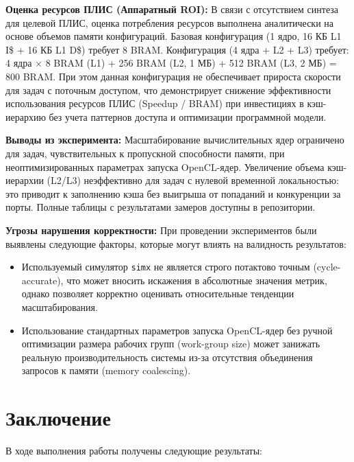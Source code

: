 \documentclass[a4paper]{article}
\begin{document}
\textbf{Оценка ресурсов ПЛИС (Аппаратный ROI):}
В связи с отсутствием синтеза для целевой ПЛИС, оценка потребления ресурсов выполнена аналитически на основе объемов памяти конфигураций. Базовая конфигурация (1 ядро, 16 КБ L1 I\$ + 16 КБ L1 D\$) требует 8 BRAM. Конфигурация (4 ядра + L2 + L3) требует: 4 ядра $\times$ 8 BRAM (L1) + 256 BRAM (L2, 1 МБ) + 512 BRAM (L3, 2 МБ) = 800 BRAM. При этом данная конфигурация не обеспечивает прироста скорости для задач с поточным доступом, что демонстрирует снижение эффективности использования ресурсов ПЛИС (Speedup / BRAM) при инвестициях в кэш-иерархию без учета паттернов доступа и оптимизации программной модели.

\textbf{Выводы из эксперимента:} Масштабирование вычислительных ядер ограничено для задач, чувствительных к пропускной способности памяти, при неоптимизированных параметрах запуска OpenCL-ядер. Увеличение объема кэш-иерархии (L2/L3) неэффективно для задач с нулевой временной локальностью: это приводит к заполнению кэша без выигрыша от попаданий и конкуренции за порты. Полные таблицы с результатами замеров доступны в репозитории.

\textbf{Угрозы нарушения корректности:}
При проведении экспериментов были выявлены следующие факторы, которые могут влиять на валидность результатов:
\begin{itemize}
    \item Используемый симулятор \texttt{simx} не является строго потактово точным (cycle-accurate), что может вносить искажения в абсолютные значения метрик, однако позволяет корректно оценивать относительные тенденции масштабирования.
    \item Использование стандартных параметров запуска OpenCL-ядер без ручной оптимизации размера рабочих групп (work-group size) может занижать реальную производительность системы из-за отсутствия объединения запросов к памяти (memory coalescing).
\end{itemize}

\section{Заключение}

В ходе выполнения работы получены следующие результаты:
\end{document}

